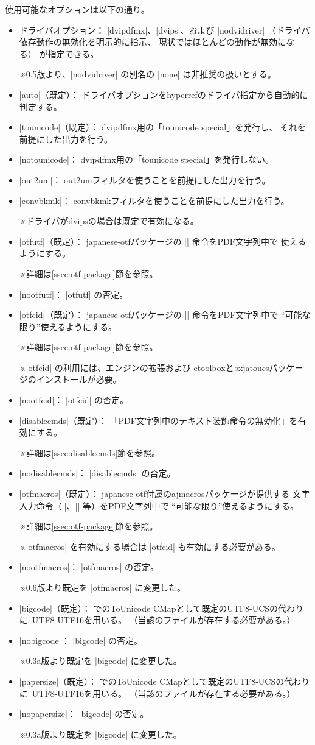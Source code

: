\documentclass[uplatex,a4paper]{jsarticle}
\newcommand{\Pkg}[1]{\textsf{#1}}
\newcommand{\Note}{\par\noindent ※}
\newcommand{\Means}{：\quad}
\providecommand{\Strong}[1]{\textsf{#1}}
\begin{document}
使用可能なオプションは以下の通り。
\begin{itemize}
\item \Strong{ドライバオプション}\Means
  |dvipdfmx|、|dvips|、および |nodvidriver|%
  （ドライバ依存動作の無効化を明示的に指示、
  現状ではほとんどの動作が無効になる）
  が指定できる。
  \Note 0.5版より、|nodvidriver| の別名の |none| は非推奨の扱いとする。
\item |auto|（既定）\Means
  ドライバオプションを\Pkg{hyperref}のドライバ指定から自動的に判定する。
\item |tounicode|（既定）\Means
  dvipdfmx用の「tounicode special」を発行し、
  それを前提にした出力を行う。
\item |notounicode|\Means
  dvipdfmx用の「tounicode special」を発行しない。
\item |out2uni|\Means
  out2uniフィルタを使うことを前提にした出力を行う。
\item |convbkmk|\Means
  convbkmkフィルタを使うことを前提にした出力を行う。
  \Note ドライバがdvipsの場合は既定で有効になる。
\item |otfutf|（既定）\Means
  \Pkg{japanese-otf}パッケージの |\UTF| 命令をPDF文字列中で
  使えるようにする。
  \Note 詳細は\ref{ssec:otf-package}節を参照。
\item |nootfutf|\Means
  |otfutf| の否定。
\item |otfcid|（既定）\Means
  \Pkg{japanese-otf}パッケージの |\CID| 命令をPDF文字列中で
  “可能な限り”使えるようにする。
  \Note 詳細は\ref{ssec:otf-package}節を参照。
  \Note |otfcid| の利用には、エンジンの{\eTeX}拡張および
  \Pkg{etoolbox}と\Pkg{bxjatoucs}パッケージのインストールが必要。
\item |nootfcid|\Means
  |otfcid| の否定。
\item |disablecmds|（既定）\Means
  「PDF文字列中のテキスト装飾命令の無効化」を有効にする。
  \Note 詳細は\ref{ssec:disablecmds}節を参照。
\item |nodisablecmds|\Means
  |disablecmds| の否定。
\item |otfmacros|（既定）\Means
  \Pkg{japanese-otf}付属の\Pkg{ajmacros}パッケージが提供する
  文字入力命令（|\ajMaru|、|\ajLig| 等）をPDF文字列中で
  “可能な限り”使えるようにする。
  \Note 詳細は\ref{ssec:otf-package}節を参照。
  \Note |otfmacros| を有効にする場合は |otfcid| も有効にする必要がある。
\item |nootfmacros|\Means
  |otfmacros| の否定。
  \Note 0.6版より既定を |otfmacros| に変更した。
\item |bigcode|（既定）\Means
  {\upTeX}でのToUnicode CMapとして既定のUTF8-UCSの代わりに\ 
  UTF8-UTF16を用いる。
  （当該のファイルが存在する必要がある。）
\item |nobigcode|\Means
  |bigcode| の否定。
  \Note 0.3a版より既定を |bigcode| に変更した。
\item |papersize|（既定）\Means
  {\upTeX}でのToUnicode CMapとして既定のUTF8-UCSの代わりに\ 
  UTF8-UTF16を用いる。
  （当該のファイルが存在する必要がある。）
\item |nopapersize|\Means
  |bigcode| の否定。
  \Note 0.3a版より既定を |bigcode| に変更した。
\end{itemize}
\end{document}
